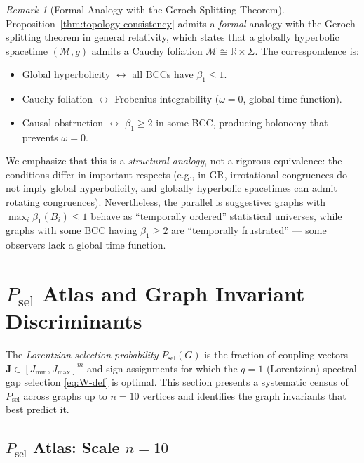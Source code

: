 \documentclass[11pt]{article}
\theoremstyle{definition}
\theoremstyle{remark}
\newtheorem{remark}[theorem]{Remark}
\newcommand{\vort}{\omega}
\newcommand{\coupl}{\mathbf{J}}
\newcommand{\betti}{\beta_1}
\begin{document}
\begin{remark}[Formal Analogy with the Geroch Splitting Theorem]
Proposition~\ref{thm:topology-consistency} admits a \emph{formal} analogy
with the Geroch splitting theorem in general relativity, which states
that a globally hyperbolic spacetime $(\mathcal{M}, g)$ admits a Cauchy
foliation $\mathcal{M} \cong \mathbb{R} \times \Sigma$.  The
correspondence is:
\begin{itemize}
\item Global hyperbolicity $\leftrightarrow$ all BCCs have $\betti \leq 1$.
\item Cauchy foliation $\leftrightarrow$ Frobenius integrability ($\vort = 0$,
  global time function).
\item Causal obstruction $\leftrightarrow$ $\betti \geq 2$ in some BCC,
  producing holonomy that prevents $\vort = 0$.
\end{itemize}
We emphasize that this is a \emph{structural analogy}, not a rigorous
equivalence: the conditions differ in important respects (e.g., in GR,
irrotational congruences do not imply global hyperbolicity, and globally
hyperbolic spacetimes can admit rotating congruences).  Nevertheless,
the parallel is suggestive: graphs with $\max_i \betti(B_i) \leq 1$
behave as ``temporally ordered'' statistical universes, while graphs
with some BCC having $\betti \geq 2$ are ``temporally frustrated'' ---
some observers lack a global time function.
\end{remark}

\section{$P_{\mathrm{sel}}$ Atlas and Graph Invariant Discriminants}
\label{sec:psel-atlas}

The \emph{Lorentzian selection probability} $P_{\mathrm{sel}}(G)$ is the
fraction of coupling vectors $\coupl \in [J_{\min}, J_{\max}]^m$ and sign
assignments for which the $q = 1$ (Lorentzian) spectral gap selection
\eqref{eq:W-def} is optimal. This section presents a systematic census of
$P_{\mathrm{sel}}$ across graphs up to $n = 10$ vertices and identifies
the graph invariants that best predict it.

\subsection{$P_{\mathrm{sel}}$ Atlas: Scale $n = 10$}
\label{subsec:psel-n10}
\end{document}
